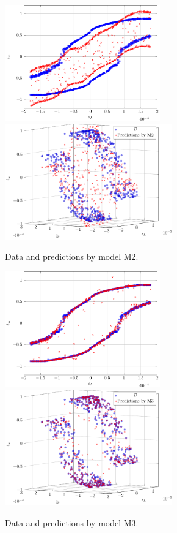 \begin{figure}[H]
	\centering 
	\includegraphics[height=5cm]{graphics/pgfplots/cha6/M2_2d.pdf}\quad
	\includegraphics[height=5cm]{graphics/pgfplots/cha6/M2_3d.pdf}
	\caption{Data and predictions by model M2.}
	\label{fig:bosch-M2}
\end{figure}

\begin{figure}[H]
	\centering 
	\includegraphics[height=5cm]{graphics/pgfplots/cha6/M3_2d.pdf}\quad
	\includegraphics[height=5cm]{graphics/pgfplots/cha6/M3_3d.pdf}
	\caption{Data and predictions by model M3.}
	\label{fig:bosch-M3}
\end{figure}

